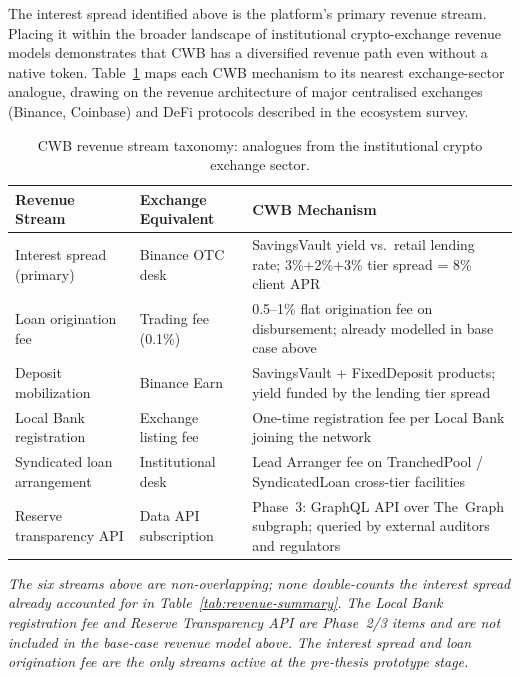 \documentclass[12pt,a4paper]{report}
\begin{document}
\vspace{6pt}
\noindent The interest spread identified above is the platform's primary revenue stream. Placing it within the broader landscape of institutional crypto-exchange revenue models demonstrates that CWB has a diversified revenue path even without a native token. Table~\ref{tab:revenue-taxonomy} maps each CWB mechanism to its nearest exchange-sector analogue, drawing on the revenue architecture of major centralised exchanges (Binance, Coinbase) and DeFi protocols described in the ecosystem survey.

\begin{table}[H]
\centering
\caption{CWB revenue stream taxonomy: analogues from the institutional crypto exchange sector.}
\label{tab:revenue-taxonomy}
\renewcommand{\arraystretch}{1.25}
\small
\begin{tabular}{p{3.8cm}p{3.8cm}p{5.6cm}}
\hline
\textbf{Revenue Stream} & \textbf{Exchange Equivalent} & \textbf{CWB Mechanism} \\
\hline
Interest spread (primary) & Binance OTC desk & SavingsVault yield vs.\ retail lending rate; 3\%+2\%+3\% tier spread = 8\% client APR \\
\hline
Loan origination fee & Trading fee (0.1\%) & 0.5--1\% flat origination fee on disbursement; already modelled in base case above \\
\hline
Deposit mobilization & Binance Earn & SavingsVault + FixedDeposit products; yield funded by the lending tier spread \\
\hline
Local Bank registration & Exchange listing fee & One-time registration fee per Local Bank joining the network \\
\hline
Syndicated loan arrangement & Institutional desk & Lead Arranger fee on TranchedPool / SyndicatedLoan cross-tier facilities \\
\hline
Reserve transparency API & Data API subscription & Phase~3: GraphQL API over The~Graph subgraph; queried by external auditors and regulators \\
\hline
\end{tabular}
\end{table}

\vspace{2pt}
\noindent\textit{\small The six streams above are non-overlapping; none double-counts the interest spread already accounted for in Table~\ref{tab:revenue-summary}. The Local Bank registration fee and Reserve Transparency API are Phase~2/3 items and are not included in the base-case revenue model above. The interest spread and loan origination fee are the only streams active at the pre-thesis prototype stage.}
\end{document}
